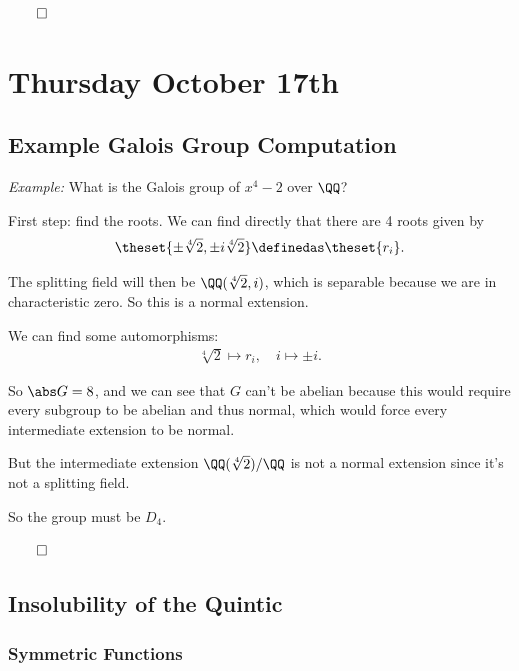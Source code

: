 \(\qed\)

\hypertarget{thursday-october-17th}{%
\section{Thursday October 17th}\label{thursday-october-17th}}

\hypertarget{example-galois-group-computation}{%
\subsection{Example Galois Group
Computation}\label{example-galois-group-computation}}

\emph{Example:} What is the Galois group of \(x^4-2\) over \(\QQ\)?

First step: find the roots. We can find directly that there are 4 roots
given by
\begin{align*}
\theset{\pm \sqrt[4] 2, \pm i \sqrt[4] 2} \definedas \theset{r_i}
.\end{align*}

The splitting field will then be \(\QQ(\sqrt[4] 2, i)\), which is
separable because we are in characteristic zero. So this is a normal
extension.

We can find some automorphisms:
\begin{align*}
\sqrt[4] 2 \mapsto r_i, \quad i \mapsto \pm i
.\end{align*}

So \(\abs G = 8\), and we can see that \(G\) can't be abelian because
this would require every subgroup to be abelian and thus normal, which
would force every intermediate extension to be normal.

But the intermediate extension \(\QQ(\sqrt[4] 2)/\QQ\) is not a normal
extension since it's not a splitting field.

So the group must be \(D_4\).

\(\qed\)

\hypertarget{insolubility-of-the-quintic}{%
\subsection{Insolubility of the
Quintic}\label{insolubility-of-the-quintic}}

\hypertarget{symmetric-functions}{%
\subsubsection{Symmetric Functions}\label{symmetric-functions}}

